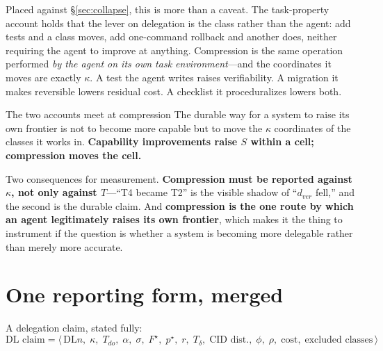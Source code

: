 \documentclass[11pt]{article}
\theoremstyle{definition}
\newcommand{\Td}{\ensuremath{T_\delta}}
\newcommand{\pstar}{\ensuremath{p^{\star}}}
\newcommand{\dver}{\ensuremath{d_{ver}}}
\newcommand{\kap}{\ensuremath{\kappa}}
\begin{document}
Placed against \S\ref{sec:collapse}, this is more than a caveat. The task-property account holds that the lever on delegation is the class rather than the agent: add tests and a class moves, add one-command rollback and another does, neither requiring the agent to improve at anything. Compression is the same operation performed \emph{by the agent on its own task environment}---and the coordinates it moves are exactly \kap{}. A test the agent writes raises verifiability. A migration it makes reversible lowers residual cost. A checklist it proceduralizes lowers both.

\begin{claimbox}{The two accounts meet at compression}
The durable way for a system to raise its own frontier is not to become more capable but to move the \kap{} coordinates of the classes it works in. \textbf{Capability improvements raise $S$ within a cell; compression moves the cell.}

Two consequences for measurement. \textbf{Compression must be reported against \kap{}, not only against $T$}---``T4 became T2'' is the visible shadow of ``\dver{} fell,'' and the second is the durable claim. And \textbf{compression is the one route by which an agent legitimately raises its own frontier}, which makes it the thing to instrument if the question is whether a system is becoming more delegable rather than merely more accurate.
\end{claimbox}

\section{One reporting form, merged}\label{sec:form}

A delegation claim, stated fully:
\begin{equation*}
\text{DL claim}=\big\langle\,\text{DL}n,\;\kap,\;T_{do},\;\alpha,\;\sigma,\;F^{\star},\;\pstar,\;r,\;\Td,\;\text{CID dist.},\;\phi,\;\rho,\;\text{cost},\;\text{excluded classes}\,\big\rangle
\end{equation*}
\end{document}
